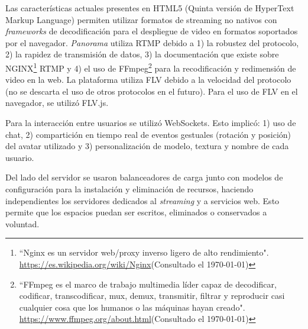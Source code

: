 Las características actuales presentes en HTML5 (Quinta versión de HyperText Markup Language) permiten utilizar formatos de streaming no nativos con \textit{frameworks} de decodificación para el despliegue de video en formatos soportados por el navegador. \textit{Panorama} utiliza RTMP debido a 1) la robustez del protocolo, 2) la rapidez de transmisión de datos, 3) la documentación que existe sobre NGINX\footnote{``Nginx es un servidor web/proxy inverso ligero de alto rendimiento". \url{https://es.wikipedia.org/wiki/Nginx}(Consultado el \today)} RTMP y 4) el uso de FFmpeg\footnote{``FFmpeg es el marco de trabajo multimedia líder capaz de decodificar, codificar, transcodificar, mux, demux, transmitir, filtrar y reproducir casi cualquier cosa que los humanos o las máquinas hayan creado". \url{https://www.ffmpeg.org/about.html}(Consultado el \today)} para la recodificación y redimensión de video en la web. La plataforma utiliza FLV debido a la velocidad del protocolo (no se descarta el uso de otros protocolos en el futuro). Para el uso de FLV en el navegador, se utilizó FLV.js. 

Para la interacción entre usuarios se utilizó WebSockets. Esto implicó: 1) uso de chat, 2) compartición en tiempo real de eventos gestuales (rotación y posición) del avatar utilizado y 3) personalización de modelo, textura y nombre de cada usuario. 

Del lado del servidor se usaron balanceadores de carga junto con modelos de configuración para la instalación y eliminación de recursos, haciendo independientes los servidores dedicados al \textit{streaming} y a servicios web. Esto permite que los espacios puedan ser escritos, eliminados o conservados a voluntad. 


